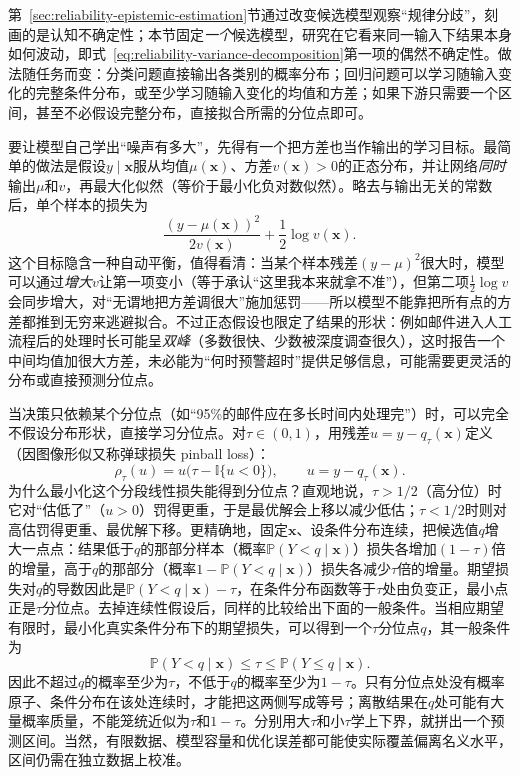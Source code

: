 第~\ref{sec:reliability-epistemic-estimation}节通过改变候选模型观察“规律分歧”，刻画的是认知不确定性；本节固定\emph{一个}候选模型，研究在它看来同一输入下结果本身如何波动，即式~\eqref{eq:reliability-variance-decomposition}第一项的偶然不确定性。做法随任务而变：分类问题直接输出各类别的概率分布；回归问题可以学习随输入变化的完整条件分布，或至少学习随输入变化的均值和方差；如果下游只需要一个区间，甚至不必假设完整分布，直接拟合所需的分位点即可。

要让模型自己学出“噪声有多大”，先得有一个把方差也当作输出的学习目标。最简单的做法是假设$y\mid\bm{x}$服从均值$\mu(\bm{x})$、方差$v(\bm{x})>0$的正态分布，并让网络\emph{同时}输出$\mu$和$v$，再最大化似然（等价于最小化负对数似然）。略去与输出无关的常数后，单个样本的损失为
\[
 \frac{(y-\mu(\bm{x}))^2}{2v(\bm{x})}
       +\frac12\log v(\bm{x}).
\]
这个目标隐含一种自动平衡，值得看清：当某个样本残差$(y-\mu)^2$很大时，模型可以通过\emph{增大}$v$让第一项变小（等于承认“这里我本来就拿不准”），但第二项$\tfrac12\log v$会同步增大，对“无谓地把方差调很大”施加惩罚——所以模型不能靠把所有点的方差都推到无穷来逃避拟合。不过正态假设也限定了结果的形状：例如邮件进入人工流程后的处理时长可能呈\emph{双峰}（多数很快、少数被深度调查很久），这时报告一个中间均值加很大方差，未必能为“何时预警超时”提供足够信息，可能需要更灵活的分布或直接预测分位点。

当决策只依赖某个分位点（如“95\%的邮件应在多长时间内处理完”）时，可以完全不假设分布形状，直接学习分位点。对$\tau\in(0,1)$，用残差$u=y-q_\tau(\bm{x})$定义（因图像形似又称弹球损失 pinball loss）：
\[
\rho_\tau(u)=u\bigl(\tau-\mathbb I\{u<0\}\bigr),
 \qquad u=y-q_\tau(\bm{x}).
\]
为什么最小化这个分段线性损失能得到分位点？直观地说，$\tau>1/2$（高分位）时它对“估低了”（$u>0$）罚得更重，于是最优解会上移以减少低估；$\tau<1/2$时则对高估罚得更重、最优解下移。更精确地，固定$\bm x$、设条件分布连续，把候选值$q$增大一点点：结果低于$q$的那部分样本（概率$\mathbb P(Y<q\mid\bm x)$）损失各增加$(1-\tau)$倍的增量，高于$q$的那部分（概率$1-\mathbb P(Y<q\mid\bm x)$）损失各减少$\tau$倍的增量。期望损失对$q$的导数因此是$\mathbb P(Y<q\mid\bm x)-\tau$，在条件分布函数等于$\tau$处由负变正，最小点正是$\tau$分位点。去掉连续性假设后，同样的比较给出下面的一般条件。当相应期望有限时，最小化真实条件分布下的期望损失，可以得到一个$\tau$分位点$q$，其一般条件为
\[
 \mathbb P(Y<q\mid\bm x)\leq\tau
 \leq\mathbb P(Y\leq q\mid\bm x).
\]
因此不超过$q$的概率至少为$\tau$，不低于$q$的概率至少为$1-\tau$。只有分位点处没有概率原子、条件分布在该处连续时，才能把这两侧写成等号；离散结果在$q$处可能有大量概率质量，不能笼统近似为$\tau$和$1-\tau$。分别用大$\tau$和小$\tau$学上下界，就拼出一个预测区间。当然，有限数据、模型容量和优化误差都可能使实际覆盖偏离名义水平，区间仍需在独立数据上校准。


